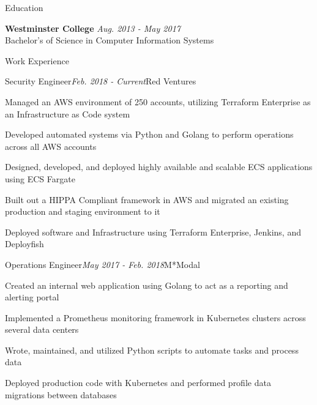 \documentclass{resume} %
\begin{document}

\begin{rSection}{\vspace{-10pt}Education}

{\bf Westminster College} \hfill {\em Aug. 2013 - May 2017} 
\\ Bachelor's of Science in Computer Information Systems


\end{rSection}

\begin{rSection}{\vspace{-5pt}Work Experience}

\begin{rSubsection}{Security Engineer}{\em Feb. 2018 - Current}{Red Ventures}{}
\item {Managed an AWS environment of 250 accounts, utilizing Terraform Enterprise as an Infrastructure as Code system}
\item {Developed automated systems via Python and Golang to perform operations across all AWS accounts}
\item {Designed, developed, and deployed highly available and scalable ECS applications using ECS Fargate}
\item {Built out a HIPPA Compliant framework in AWS and migrated an existing production and staging environment to it }
\item {Deployed software and Infrastructure using Terraform Enterprise, Jenkins, and Deployfish}

\end{rSubsection}



\begin{rSubsection}{Operations Engineer}{\em May 2017 - Feb. 2018}{M*Modal}{}
\item {Created an internal web application using Golang to act as a reporting and alerting portal}
\item {Implemented a Prometheus monitoring framework in Kubernetes clusters across several data centers}
\item {Wrote, maintained, and utilized Python scripts to automate tasks and process data}
\item {Deployed production code with Kubernetes and performed profile data migrations between databases}
\end{rSubsection}

\end{rSection}
\end{document}
